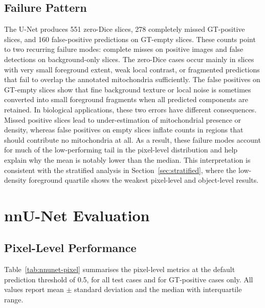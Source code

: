\documentclass[logo,bsc,singlespacing,parskip,online]{infthesis}
\begin{document}
\subsection{Failure Pattern}
The U-Net produces 551 zero-Dice slices, 278 completely missed GT-positive
slices, and 160 false-positive predictions on GT-empty slices. These counts
point to two recurring failure modes: complete misses on positive images and
false detections on background-only slices. The zero-Dice cases occur mainly
in slices with very small foreground extent, weak local contrast, or
fragmented predictions that fail to overlap the annotated mitochondria
sufficiently. The false positives on GT-empty slices show that fine
background texture or local noise is sometimes converted into small foreground
fragments when all predicted components are retained. In biological applications, 
these two errors have different consequences. Missed positive slices lead
to under-estimation of mitochondrial presence or density, whereas false
positives on empty slices inflate counts in regions that should contribute no
mitochondria at all. As a result, these failure modes account for much of the
low-performing tail in the pixel-level distribution and help explain why the
mean is notably lower than the median. This interpretation is consistent with
the stratified analysis in Section~\ref{sec:stratified}, where the low-density
foreground quartile shows the weakest pixel-level and object-level results.

\section{nnU-Net Evaluation}
\label{sec:nnunet-results}

\subsection{Pixel-Level Performance}
\label{sec:nnunet-pixel}

Table~\ref{tab:nnunet-pixel} summarises the pixel-level metrics at the default
prediction threshold of 0.5, for all test cases and for GT-positive cases only.
All values report mean $\pm$ standard deviation and the median with
interquartile range.
\end{document}
